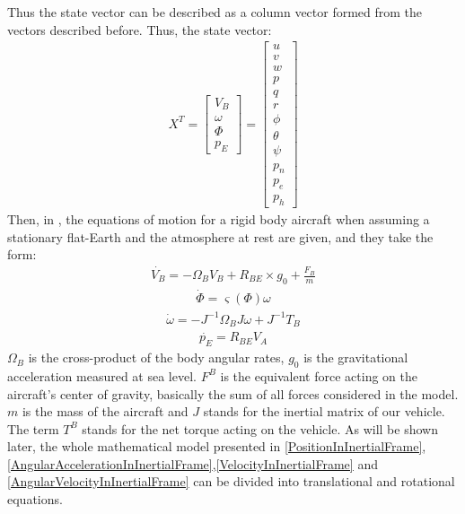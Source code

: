 \documentclass[twocolumn,showpacs,
    nofootinbib,aps,superscriptaddress,
    eqsecnum,prd,showkeys,10pt,floatfix]{revtex4}
\begin{document}
\par
Thus the state vector can be described as a column vector formed from the
vectors described before. Thus, the state vector:
\begin{align}
    X^T={\begin{bmatrix}
             V_B     \\
             \omega  \\
             \varPhi \\
             p_E
         \end{bmatrix}}
        ={\begin{bmatrix}
                  u      \\
                  v      \\
                  w      \\
                  p      \\
                  q      \\
                  r      \\
                  \phi   \\
                  \theta \\
                  \psi   \\
                  p_n    \\
                  p_e    \\
                  p_h
              \end{bmatrix}}
\end{align}
Then, in {\cite{Equations_of_Motion}}, the equations of motion for a rigid body aircraft when assuming a stationary flat-Earth and the atmosphere at rest are given, and they take the form:
\begin{align}
    {\dot{V_B}}={-{\Omega_B}{V_B}+R_{BE}\times{g_0}+\frac{F_B}{m}}
    \label{VelocityInInertialFrame}
\end{align}
\begin{align}
    {\dot{\varPhi}}={\varsigma(\varPhi)\omega}
    \label{AngularAccelerationInInertialFrame}
\end{align}
\begin{align}
    {\dot{\omega}}={-{J}^{-1}{\Omega_B}{J}\omega+J^{-1}T_B}
    \label{AngularVelocityInInertialFrame}
\end{align}
\begin{align}
    {\dot{p_E}}={R_{BE}V_A}
    \label{PositionInInertialFrame}
\end{align}
$\Omega_B$ is the cross-product of the body angular rates, $g_0$ is the gravitational acceleration measured at sea level.
$F^B$ is the equivalent force acting on the aircraft's center of gravity, basically the sum of all forces considered in the model.
$m$ is the mass of the aircraft and $J$ stands for the inertial matrix of our vehicle.
The term $T^B$ stands for the net torque acting on the vehicle.
As will be shown later, the whole mathematical model presented in {\ref{PositionInInertialFrame}},{\ref{AngularAccelerationInInertialFrame}},{\ref{VelocityInInertialFrame}} and {\ref{AngularVelocityInInertialFrame}} can be divided into translational and rotational equations.
\end{document}
